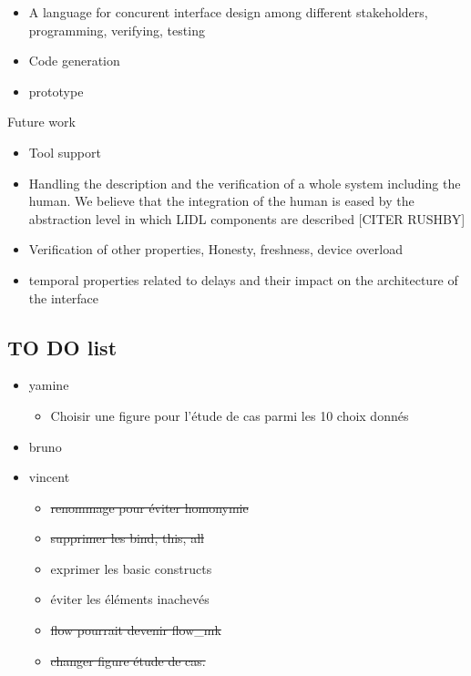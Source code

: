 
\begin{itemize}
\item  A language for concurent interface design among different stakeholders, programming, verifying, testing
\item Code generation
\item prototype

\end{itemize}
Future  work
\begin{itemize}
\item Tool support 
\item Handling the description and the verification of a whole system including the human. We believe that the integration of the human is eased by the abstraction level in which LIDL components are described [CITER RUSHBY]
\item Verification of other properties, Honesty, freshness, device overload 
\item temporal properties related to delays and their impact on the architecture of the interface
 
\end{itemize}

\subsection{TO DO list}

\begin{itemize}



\item yamine
\begin {itemize}
\item Choisir une figure pour l'étude de cas parmi les 10 choix donnés
\end {itemize}


\item bruno

\item vincent
\begin{itemize}
\item \sout{renommage pour éviter homonymie}
\item \sout{supprimer les bind, this, all}
\item exprimer les basic constructs
\item éviter les éléments inachevés
\item \sout{flow pourrait devenir flow\_mk}
\item  \sout{changer figure étude de cas.}
\end{itemize}



\end{itemize}
